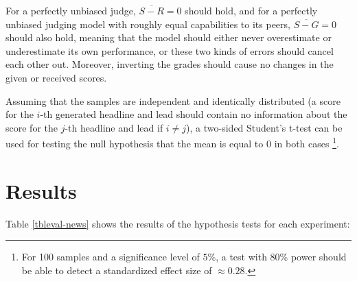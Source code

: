 \documentclass[noindent,nohyp,parspace,titlepage,twoside,12pt]{article}
\begin{document}
      For a perfectly unbiased judge, $\overline{S - R} = 0$ should hold, and
      for a perfectly unbiased judging model with roughly equal capabilities to
      its peers, $\overline{S - G} = 0$ should also hold, meaning that the
      model should either never overestimate or underestimate its own
      performance, or these two kinds of errors should cancel each other out.
      Moreover, inverting the grades should cause no changes in the given or
      received scores.

      Assuming that the samples are independent and identically distributed
      (a score for the $i$-th generated headline and lead should contain no
      information about the score for the $j$-th headline and lead if
      $i \neq j$), a two-sided Student's t-test can be used for testing the null
      hypothesis that the mean is equal to 0 in both cases \footnote{For
      100 samples and a significance level of $5\%$, a test with $80\%$ power
      should be able to detect a standardized effect size of $\approx 0.28$.}.

  \section{Results}

    Table \ref{tbleval-news} shows the results of the hypothesis tests for each
    experiment:
\end{document}
